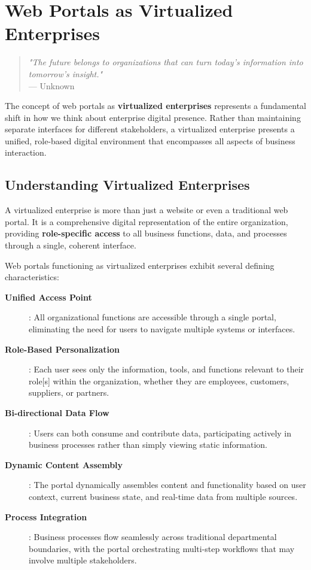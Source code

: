 
\chapter{Web Portals as Virtualized Enterprises}
\label{chap:virtualized-enterprises}

\begin{quote}
\textit{"The future belongs to organizations that can turn today's information into tomorrow's insight."} \\
— Unknown
\end{quote}

The concept of web portals as \textbf{virtualized enterprises} represents a fundamental shift in how we think about enterprise digital presence. Rather than maintaining separate interfaces for different stakeholders, a virtualized enterprise presents a unified, role-based digital environment that encompasses all aspects of business interaction.

\section{Understanding Virtualized Enterprises}
\label{sec:understanding-virtualized}

A virtualized enterprise is more than just a website or even a traditional web portal. It is a comprehensive digital representation of the entire organization, providing \textbf{role-specific access} to all business functions, data, and processes through a single, coherent interface.

Web portals functioning as virtualized enterprises exhibit several defining characteristics:

\begin{description}
\item[\textbf{Unified Access Point}]: All organizational functions are accessible through a single portal, eliminating the need for users to navigate multiple systems or interfaces.

\item[\textbf{Role-Based Personalization}]: Each user sees only the information, tools, and functions relevant to their role[s] within the organization, whether they are employees, customers, suppliers, or partners.

\item[\textbf{Bi-directional Data Flow}]: Users can both consume and contribute data, participating actively in business processes rather than simply viewing static information.

\item[\textbf{Dynamic Content Assembly}]: The portal dynamically assembles content and functionality based on user context, current business state, and real-time data from multiple sources.

\item[\textbf{Process Integration}]: Business processes flow seamlessly across traditional departmental boundaries, with the portal orchestrating multi-step workflows that may involve multiple stakeholders.
\end{description}


